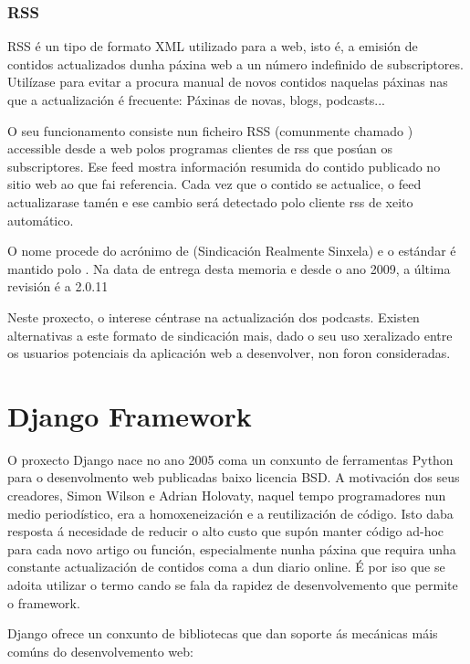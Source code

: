 \subsubsection{RSS}
\label{rss}

RSS é un tipo de formato XML utilizado para a  web, isto é, a emisión de contidos actualizados dunha páxina web a un número indefinido de subscriptores. Utilízase para evitar a procura manual de novos contidos naquelas páxinas nas que a actualización é frecuente: Páxinas de novas, blogs, podcasts... 

O seu funcionamento consiste nun ficheiro RSS (comunmente chamado ) accessible desde a web polos programas clientes de rss que posúan os subscriptores. Ese feed mostra información resumida do contido publicado no sitio web ao que fai referencia. Cada vez que o contido se actualice, o feed actualizarase tamén e ese cambio será detectado polo cliente rss de xeito automático.
 
O nome procede do acrónimo de (Sindicación Realmente Sinxela) e o estándar é mantido polo . Na data de entrega desta memoria e desde o ano 2009, a última revisión é a 2.0.11 \cite{rss}

Neste proxecto, o interese céntrase na actualización dos podcasts. Existen alternativas a este formato de sindicación mais, dado o seu uso xeralizado entre os usuarios potenciais da aplicación web a desenvolver, non foron consideradas.


\section{Django Framework}
\label{django}
O proxecto Django nace no ano 2005 coma un conxunto de ferramentas Python para o desenvolmento web publicadas
baixo licencia BSD. A motivación dos seus creadores, Simon Wilson e Adrian Holovaty, naquel tempo programadores
nun medio periodístico, era a homoxeneización e a reutilización de código. Isto daba resposta á necesidade de reducir
o alto custo que supón manter código ad-hoc para cada novo artigo ou función, especialmente nunha páxina que
requira unha constante actualización de contidos coma a dun diario online. É por iso que se adoita utilizar o 
termo  cando se fala da rapidez de desenvolvemento que permite o framework\cite{django1}.  

Django ofrece un conxunto de bibliotecas que dan soporte ás mecánicas máis comúns do desenvolvemento
web:

